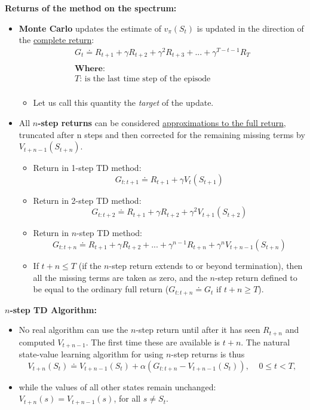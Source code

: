 \documentclass[12pt, a4paper]{article}
\begin{document}
\textbf{Returns of the method on the spectrum:}
\begin{itemize}
  \item \textbf{Monte Carlo} updates the estimate of $v_\pi(S_t)$ is updated in the direction of the \uline{complete return}:
  \begin{gather*}
    G_{t} \doteq R_{t+1} + \gamma R_{t+2} + \gamma^2 R_{t+3} + ... + \gamma^{T-t-1} R_{T} \\ \\
    \textbf{Where:} \\
    T\text{: is the last time step of the episode} \\
  \end{gather*}
  \begin{itemize}
    \item Let us call this quantity the \textit{target} of the update.
  \end{itemize}
  \item All \textbf{$n$-step returns} can be considered \uline{approximations to the full return}, truncated after n steps and then corrected for the remaining missing terms by $V_{t+n-1}(S_{t+n})$.
  \begin{itemize}
    \item Return in 1-step TD method:
    $$
    G_{t:t+1} \doteq R_{t+1} + \gamma V_{t}(S_{t+1})
    $$
    \item Return in 2-step TD method:
    $$
    G_{t:t+2} \doteq R_{t+1} + \gamma R_{t+2} + \gamma^2 V_{t+1}(S_{t+2})
    $$
    \item Return in $n$-step TD method:
    $$
    G_{t:t+n} \doteq R_{t+1} + \gamma R_{t+2} + ... + \gamma^{n-1} R_{t+n} + \gamma^{n} V_{t+n-1}(S_{t+n})
    $$
    \item If $t+n \leq T$ (if the $n$-step return extends to or beyond termination), then all the missing terms are taken as zero, and the $n$-step return defined to be equal to the ordinary full return ($G_{t:t+n} \doteq G_t \text{ if } t+n \geq T$).
  \end{itemize}
\end{itemize}


\textbf{$n$-step TD Algorithm:}
\begin{itemize}
  \item No real algorithm can use the $n$-step return until after it has seen $R_{t+n}$ and computed $V_{t+n-1}$. The first time these are available is $t+n$. The natural state-value learning algorithm for using $n$-step returns is thus
  $$
  V_{t+n}(S_t) \doteq V_{t+n-1}(S_t) + \alpha (G_{t:t+n} - V_{t+n-1}(S_t)), \;\;\;\; 0 \leq t < T,
  $$
  \item while the values of all other states remain unchanged: $V_{t+n}(s) = V_{t+n-1}(s)$, for all $s \neq S_t$.
\end{itemize}
\end{document}
